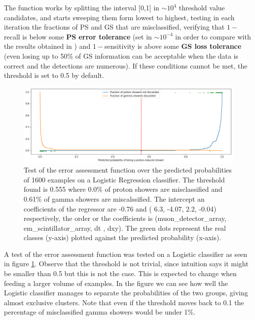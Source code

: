 \documentclass{article}
\begin{document}
The function works by splitting the interval [0,1] in $\sim10^{4}$ threshold value candidates, and starts sweeping them form lowest to highest, testing in each iteration the fractions of PS and GS that are misclassified, verifying that $1-$recall is below some \textbf{PS error tolerance} (set in $\sim10^{-4}$ in order to compare with the results obtained in \cite{UHEgammapaper}) and $1-$sensitivity is above some \textbf{GS loss tolerance} (even losing up to 50\% of GS information can be acceptable when the data is correct and the detections are numerous). If these conditions cannot be met, the threshold is set to 0.5 by default.


\begin{figure}[!h]
    \centering
    \includegraphics[width=\textwidth]{imgs/err_ass_th.png}
    \caption{Test of the error assessment function over the predicted probabilities of 1600 examples on a Logistic Regression classifier. The threshold found is 0.555 where 0.0\% of proton showers are misclassified and 0.61\% of gamma showers are miscalssified. The intercept an coefficients of the regressor are -0.76 and ( 6.3, -4.07,  2.2, -0.04) respectively, the order or the coefficients is (muon\_detector\_array, em\_scintillator\_array, dt , dxy). The green dots represent the real classes (y-axis) plotted against the predicted probability (x-axis).}
    \label{fig:err_ass_th}
\end{figure}

A test of the error assessment function was tested on a Logistic classifier as seen in figure \ref{fig:err_ass_th}. Observe that the threshold is not trivial, since intuition says it might be smaller than 0.5 but this is not the case. This is expected to change when feeding a larger volume of examples. In the figure we can see how well the Logistic classifier manages to separate the probabilities of the two groups, giving almost exclusive clusters. Note that even if the threshold moves back to 0.1 the percentage of misclassified gamma showers would be under 1\%.
\end{document}
